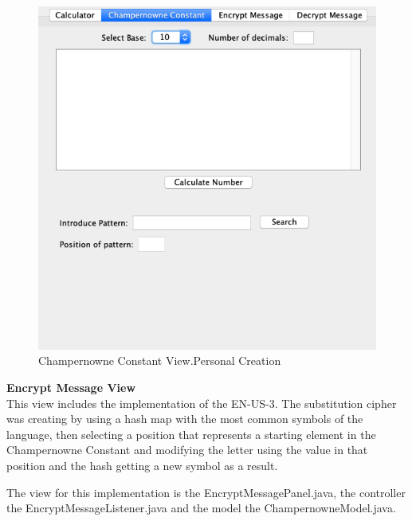 \documentclass{report}
\begin{document}
\begin{figure}[H]
\centering
\includegraphics[scale=0.5]{images/DecimalExpansion.png}
\caption[Champernowne Constant View]{Champernowne Constant View.Personal Creation}
\end{figure}

\textbf{Encrypt Message View} \\

This view includes the implementation of the EN-US-3. The substitution cipher was creating by using a hash map with the most common symbols of the language, then selecting a position that represents a starting element in the Champernowne Constant and modifying the letter using the value in that position and the hash getting a new symbol as a result.

The view for this implementation is the EncryptMessagePanel.java, the controller the EncryptMessageListener.java and the model the ChampernowneModel.java.
\end{document}
